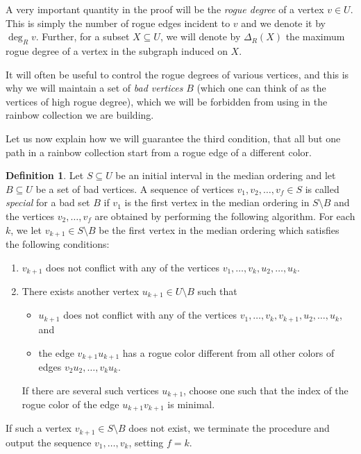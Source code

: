 \documentclass[a4paper,11pt]{article}
\theoremstyle{definition}
\newtheorem{definition}[theorem]{\bf Definition}
\begin{document}
A very important quantity in the proof will be the \textit{rogue degree} of a vertex $v\in U$. This is simply the number of rogue edges incident to $v$ and we denote it by $\deg_R v$. Further, for a subset $X\subseteq U$, we will denote by $\Delta_R(X)$ the maximum rogue degree of a vertex in the subgraph induced on $X$.

It will often be useful to control the rogue degrees of various vertices, and this is why we will maintain a set of \textit{bad vertices} $B$ (which one can think of as the vertices of high rogue degree), which we will be forbidden from using in the rainbow collection we are building.

Let us now explain how we will guarantee the third condition, that all but one path in a rainbow collection start from a rogue edge of a different color.

\begin{definition}\label{defn:special sequence}
Let $S\subseteq U$ be an initial interval in the median ordering and let $B\subseteq U$ be a set of bad vertices. A sequence of vertices $v_1, v_2, \dots, v_f\in S$ is called \textit{special} for a bad set $B$ if $v_1$ is the first vertex in the median ordering in $S\setminus B$ and the vertices $v_2, \dots, v_f$ are obtained by performing the following algorithm. For each $k$, we let $v_{k+1}\in S\setminus B$ be the first vertex in the median ordering which satisfies the following conditions:
\begin{enumerate}
    \item $v_{k+1}$ does not conflict with any of the vertices $v_1, \dots, v_k, u_2, \dots, u_{k}$.
    \item There exists another vertex $u_{k+1}\in U\setminus B$ such that 
    \begin{itemize}
    \item $u_{k+1}$ does not conflict with any of the vertices $v_1, \dots, v_k, v_{k+1}, u_2, \dots, u_{k}$, and
    \item the edge $v_{k+1}u_{k+1}$ has a rogue color different from all other colors of edges $v_2u_2, \dots, v_ku_k$.
    \end{itemize}
    
    If there are several such vertices $u_{k+1}$, choose one such that the index of the rogue color of the edge $u_{k+1}v_{k+1}$ is minimal.
\end{enumerate}
If such a vertex $v_{k+1}\in S\setminus B$ does not exist, we terminate the procedure and output the sequence $v_1, \dots, v_k$, setting $f=k$.
\end{definition}
\end{document}
